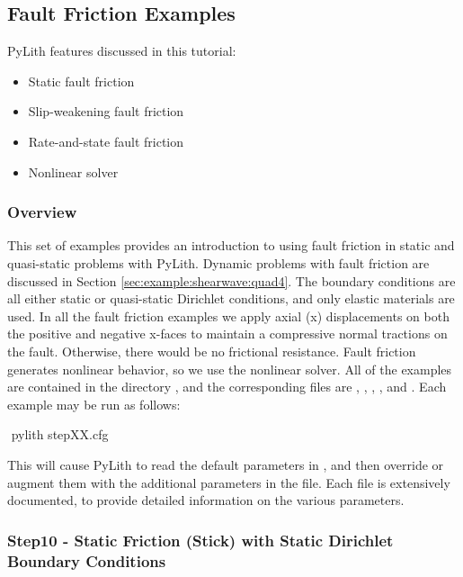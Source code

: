 \subsection{Fault Friction Examples}
\label{sec:example:3dhex8:friction}

PyLith features discussed in this tutorial:
\begin{itemize}
\item Static fault friction
\item Slip-weakening fault friction
\item Rate-and-state fault friction
\item Nonlinear solver
\end{itemize}

\subsubsection{Overview}

This set of examples provides an introduction to using fault friction
in static and quasi-static problems with PyLith. Dynamic problems
with fault friction are discussed in Section \vref{sec:example:shearwave:quad4}.
The boundary conditions are all either static or quasi-static Dirichlet
conditions, and only elastic materials are used. In all the fault
friction examples we apply axial (x) displacements on both the positive
and negative x-faces to maintain a compressive normal tractions on
the fault. Otherwise, there would be no frictional resistance. Fault
friction generates nonlinear behavior, so we use the nonlinear solver.
All of the examples are contained in the directory ,
and the corresponding  files are ,
, , , and
. Each example may be run as follows:
\begin{shell}
$$ pylith stepXX.cfg
\end{shell}
This will cause PyLith to read the default parameters in ,
and then override or augment them with the additional parameters in
the  file. Each  file is extensively
documented, to provide detailed information on the various parameters.


\subsubsection{Step10 - Static Friction (Stick) with Static Dirichlet Boundary Conditions}

